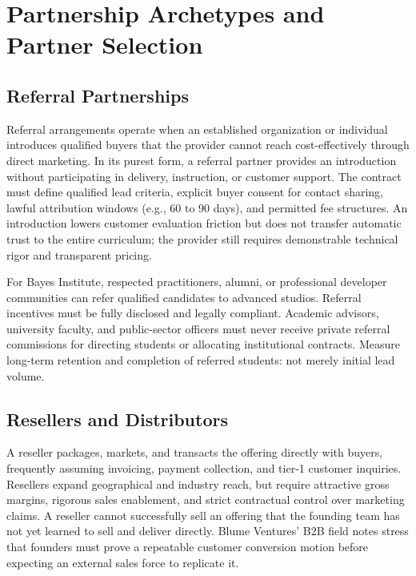 \section{Partnership Archetypes and Partner Selection}
\label{sec:ch30_partnership_archetypes_partner_selection}

\subsection{Referral Partnerships}
\label{sec:referral_partnerships}

Referral arrangements operate when an established organization or individual introduces qualified buyers that the provider cannot reach cost-effectively through direct marketing. In its purest form, a referral partner provides an introduction without participating in delivery, instruction, or customer support. The contract must define qualified lead criteria, explicit buyer consent for contact sharing, lawful attribution windows (e.g., 60 to 90 days), and permitted fee structures. An introduction lowers customer evaluation friction but does not transfer automatic trust to the entire curriculum; the provider still requires demonstrable technical rigor and transparent pricing.

For Bayes Institute, respected practitioners, alumni, or professional developer communities can refer qualified candidates to advanced studios. Referral incentives must be fully disclosed and legally compliant. Academic advisors, university faculty, and public-sector officers must never receive private referral commissions for directing students or allocating institutional contracts. Measure long-term retention and completion of referred students: not merely initial lead volume.

\subsection{Resellers and Distributors}
\label{sec:resellers_and_distributors}

A reseller packages, markets, and transacts the offering directly with buyers, frequently assuming invoicing, payment collection, and tier-1 customer inquiries. Resellers expand geographical and industry reach, but require attractive gross margins, rigorous sales enablement, and strict contractual control over marketing claims. A reseller cannot successfully sell an offering that the founding team has not yet learned to sell and deliver directly. Blume Ventures' B2B field notes stress that founders must prove a repeatable customer conversion motion before expecting an external sales force to replicate it.

